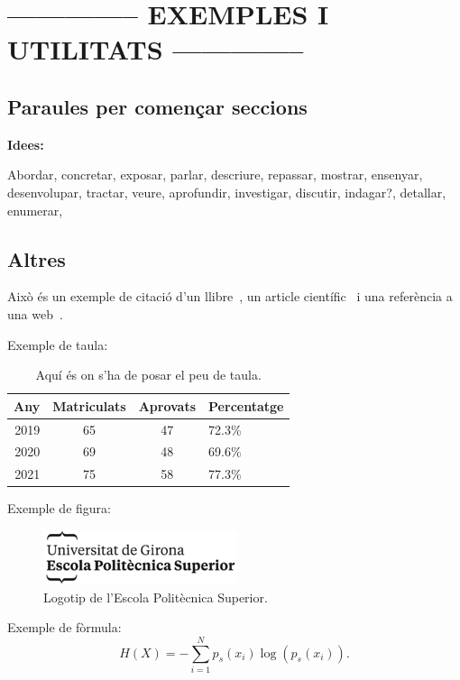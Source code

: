 \documentclass[a4paper,12pt]{ThesisStyle}
\begin{document}
\section{-------------- EXEMPLES I UTILITATS --------------}
\subsection{Paraules per començar seccions}
\textbf{Idees:}

Abordar, concretar, exposar, parlar, descriure, repassar, mostrar, ensenyar, desenvolupar, tractar, veure, aprofundir, investigar, discutir, indagar?, detallar,
enumerar,


\subsection{Altres}

Això és un exemple de citació d'un llibre~\cite{Coleman1974}, un article científic~\cite{Ruiz2008} i una referència a una web~\cite{Halcon}.

Exemple de taula:
\begin{table}[htb]
\centering
\begin{tabular}{ | r | c | c | l | }
 \hline
  Any & Matriculats & Aprovats & Percentatge\\
\hline
 2019  & 65 & 47 & 72.3\%\\
 2020  & 69 & 48 & 69.6\%\\
 2021  & 75 & 58 & 77.3\%\\
  \hline
  \end{tabular}
\caption{\label{taula:taulaexemple} Aquí és on s'ha de posar el peu de taula. }
\end{table}

Exemple de figura:
\begin{figure}[htb]
\centering
\includegraphics[width=8 cm]{imatges/logo_eps.png}
\caption{\label{fig:logo} Logotip de l'Escola Politècnica Superior.}
\end{figure}

Exemple de fòrmula:
\begin{equation}
H(X) = -\sum_{i=1}^{N}p_s(x_i) \log \left( p_s(x_i) \right).
\label{equ:entropia}
\end{equation}
\end{document}
